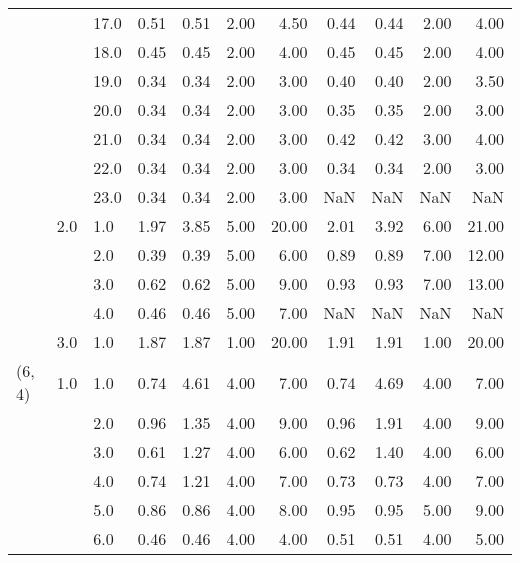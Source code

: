 \begin{tabular}{lllrrrrrrrr}
       &     & 17.0 &       0.51 &      0.51 & 2.00 &   4.50 &       0.44 &      0.44 & 2.00 &   4.00 \\
       &     & 18.0 &       0.45 &      0.45 & 2.00 &   4.00 &       0.45 &      0.45 & 2.00 &   4.00 \\
       &     & 19.0 &       0.34 &      0.34 & 2.00 &   3.00 &       0.40 &      0.40 & 2.00 &   3.50 \\
       &     & 20.0 &       0.34 &      0.34 & 2.00 &   3.00 &       0.35 &      0.35 & 2.00 &   3.00 \\
       &     & 21.0 &       0.34 &      0.34 & 2.00 &   3.00 &       0.42 &      0.42 & 3.00 &   4.00 \\
       &     & 22.0 &       0.34 &      0.34 & 2.00 &   3.00 &       0.34 &      0.34 & 2.00 &   3.00 \\
       &     & 23.0 &       0.34 &      0.34 & 2.00 &   3.00 &        NaN &       NaN &  NaN &    NaN \\
       & 2.0 & 1.0  &       1.97 &      3.85 & 5.00 &  20.00 &       2.01 &      3.92 & 6.00 &  21.00 \\
       &     & 2.0  &       0.39 &      0.39 & 5.00 &   6.00 &       0.89 &      0.89 & 7.00 &  12.00 \\
       &     & 3.0  &       0.62 &      0.62 & 5.00 &   9.00 &       0.93 &      0.93 & 7.00 &  13.00 \\
       &     & 4.0  &       0.46 &      0.46 & 5.00 &   7.00 &        NaN &       NaN &  NaN &    NaN \\
       & 3.0 & 1.0  &       1.87 &      1.87 & 1.00 &  20.00 &       1.91 &      1.91 & 1.00 &  20.00 \\
(6, 4) & 1.0 & 1.0  &       0.74 &      4.61 & 4.00 &   7.00 &       0.74 &      4.69 & 4.00 &   7.00 \\
       &     & 2.0  &       0.96 &      1.35 & 4.00 &   9.00 &       0.96 &      1.91 & 4.00 &   9.00 \\
       &     & 3.0  &       0.61 &      1.27 & 4.00 &   6.00 &       0.62 &      1.40 & 4.00 &   6.00 \\
       &     & 4.0  &       0.74 &      1.21 & 4.00 &   7.00 &       0.73 &      0.73 & 4.00 &   7.00 \\
       &     & 5.0  &       0.86 &      0.86 & 4.00 &   8.00 &       0.95 &      0.95 & 5.00 &   9.00 \\
       &     & 6.0  &       0.46 &      0.46 & 4.00 &   4.00 &       0.51 &      0.51 & 4.00 &   5.00 \\

\end{tabular}
